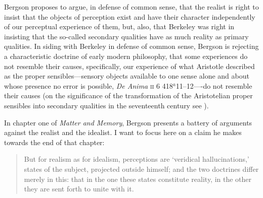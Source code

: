 \documentclass[12pt]{article}
\begin{document}
Bergson proposes to argue, in defense of common sense, that the realist is right to insist that the objects of perception exist and have their character independently of our perceptual experience of them, but, also, that Berkeley was right in insisting that the so-called secondary qualities have as much reality as primary qualities. In siding with Berkeley in defense of common sense, Bergson is rejecting a characteristic doctrine of early modern philosophy, that some experiences do not resemble their causes, specifically, our experience of what Aristotle described as the proper sensibles---sensory objects available to one sense alone and about whose presence no error is possible, \emph{De Anima} \textsc{ii} 6 418\( ^{a} \)11–12----do not resemble their causes (on the significance of the transformation of the Aristotelian proper sensibles into secondary qualities in the seventeenth century see \citealt{Smith:1990sm,Winkler:2011aa}).

In chapter one of \emph{Matter and Memory}, Bergson presents a battery of arguments against the realist and the idealist. I want to focus here on a claim he makes towards the end of that chapter:
\begin{quote}
	But for realism as for idealism, perceptions are `veridical hallucinations,' states of the subject, projected outside himself; and the two doctrines differ merely in this: that in the one these states constitute reality, in the other they are sent forth to unite with it. \citep[73]{Bergson:1912pi}
\end{quote}
\end{document}
